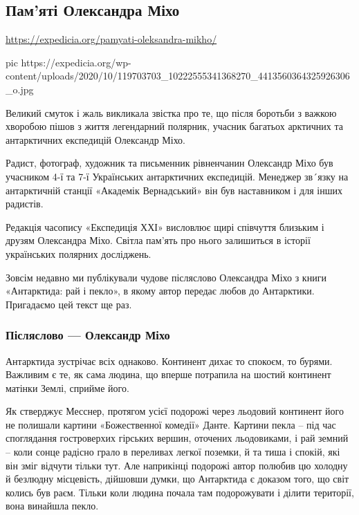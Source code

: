  
 

\subsection{Пам’яті Олександра Міхо}

\url{https://expedicia.org/pamyati-oleksandra-mikho/}

\ifcmt
pic https://expedicia.org/wp-content/uploads/2020/10/119703703_10222555341368270_4413560364325926306_o.jpg
\fi

Великий смуток і жаль викликала звістка про те, що після боротьби з важкою
хворобою пішов з життя легендарний полярник, учасник багатьох арктичних та
антарктичних експедицій Олександр Міхо.

Радист, фотограф, художник та письменник рівненчанин Олександр Міхо був
учасником 4-ї та 7-ї Українських антарктичних експедицій. Менеджер зв´язку на
антарктичній станції «Академік Вернадський» він був наставником і для інших
радистів.

Редакція часопису «Експедиція ХХІ» висловлює щирі співчуття близьким і друзям
Олександра Міхо. Світла пам’ять про нього залишиться в історії українських
полярних досліджень.

Зовсім недавно ми публікували чудове післяслово Олександра Міхо з книги
«Антарктида: рай і пекло», в якому автор передає любов до Антарктики.
Пригадаємо цей текст ще раз.

\subsubsection{Післяслово --- Олександр Міхо}

Антарктида зустрічає всіх однаково. Континент дихає то спокоєм, то бурями.
Важливим є те, як сама людина, що вперше потрапила на шостий континент матінки
Землі, сприйме його. 

Як стверджує Месснер, протягом усієї подорожі через льодовий континент його не
полишали картини «Божественної комедії» Данте. Картини пекла – під час
споглядання гостроверхих гірських вершин, оточених льодовиками, і рай земний –
коли сонце радісно грало в переливах легкої поземки, й та тиша і спокій, які
він зміг відчути тільки тут. Але наприкінці подорожі автор полюбив цю холодну й
безлюдну місцевість, дійшовши думки, що Антарктида є доказом того, що світ
колись був раєм. Тільки коли людина почала там подорожувати і ділити території,
вона винайшла пекло. 

